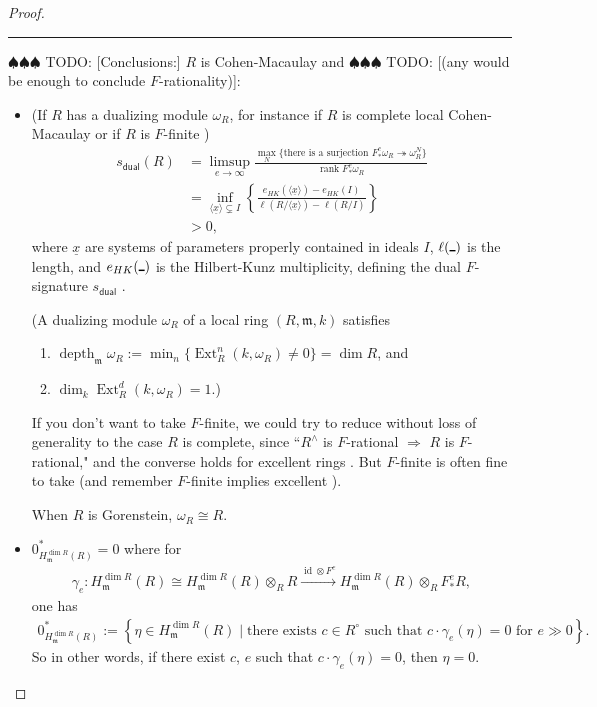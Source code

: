 \documentclass{amsart}
\theoremstyle{definition}
\def\onto{\twoheadrightarrow}
\def\xra{\xrightarrow}
\def\ux{\underline{x}}
\def\Arg{\rule{1ex}{1pt}}
\def\fm{\mathfrak{m}}
\DeclareMathOperator{\rank}{\operatorname{rank}}
\DeclareMathOperator{\Ext}{\operatorname{Ext}}
\DeclareMathOperator{\depth}{\operatorname{depth}}
\DeclareMathOperator{\id}{\operatorname{id}}
\DeclareMathOperator{\dual}{\mathsf{dual}}
\newcommand{\Fe}{F_{*}^{e}}
\newcommand{\todo}[1]{{\color{teal} \sf $\spadesuit\spadesuit\spadesuit$ TODO: [#1]}}
\begin{document}
\begin{proof}
\bigbreak\hrule\bigbreak

\todo{Conclusions:} $R$ is Cohen-Macaulay and \todo{(any would be enough to conclude $F$-rationality)}:
\begin{itemize}
\item (If $R$ has a dualizing module $\omega_{R}$, for instance if $R$ is complete local Cohen-Macaulay or if $R$ is $F$-finite \cite[Thm.\ ~1.6]{MP21})
\begin{align*}
s_{\dual}(R)&=\limsup_{e\to\infty}\frac{\max_{N}\{\text{there is a surjection }\Fe\omega_{R}\onto\omega_{R}^{N}\}}{\rank\Fe\omega_{R}}\\
&=\inf_{\langle\ux\rangle\subsetneq I}\left\{\frac{e_{HK}(\langle\ux\rangle)-e_{HK}(I)}{\ell(R/\langle\ux\rangle)-\ell(R/I)}\right\}\\
&>0,
\end{align*}
where $\ux$ are systems of parameters properly contained in ideals $I$, $\ell(\Arg)$ is the length, and $e_{HK}(\Arg)$ is the Hilbert-Kunz multiplicity, defining the dual $F$-signature $s_{\dual}$ \cite[\S1]{ST19}. 

(A dualizing module $\omega_{R}$ of a local ring $(R,\fm,k)$ satisfies
\begin{enumerate}
\item $\depth_{\fm}\omega_{R}:=\min_{n}\{\Ext_{R}^{n}(k,\omega_{R})\neq0\}=\dim R$, and
\item $\dim_{k}\Ext_{R}^{d}(k,\omega_{R})=1$.)
\end{enumerate}

If you don't want to take $F$-finite, we could try to reduce without loss of generality to the case $R$ is complete, since ``$R^{\wedge}$ is $F$-rational $\Rightarrow$ $R$ is $F$-rational," and the converse holds for excellent rings \cite[Thm.\ ~6.16]{MP21}. But $F$-finite is often fine to take (and remember $F$-finite implies excellent \cite[Thm.\ ~1.7]{MP21}).

When $R$ is Gorenstein, $\omega_{R}\cong R$.

\item $0_{H_{\fm}^{\dim R}(R)}^{*}=0$ where for
\begin{align*}
\gamma_{e}\colon H_{\fm}^{\dim R}(R)\cong H_{\fm}^{\dim R}(R)\otimes_{R}R\xra{\id\otimes F^{e}}H_{\fm}^{\dim R}(R)\otimes_{R}\Fe R,
\end{align*}
one has
\begin{align*}
0_{H_{\fm}^{\dim R}(R)}^{*}:=\left\{\eta\in H_{\fm}^{\dim R}(R)\mid\text{there exists }c\in R^{\circ}\text{ such that }c\cdot\gamma_{e}(\eta)=0\text{ for }e\gg0\right\}.
\end{align*}
So in other words, if there exist $c$, $e$ such that $c\cdot\gamma_{e}(\eta)=0$, then $\eta=0$.


\end{itemize}
\end{proof}
\end{document}
